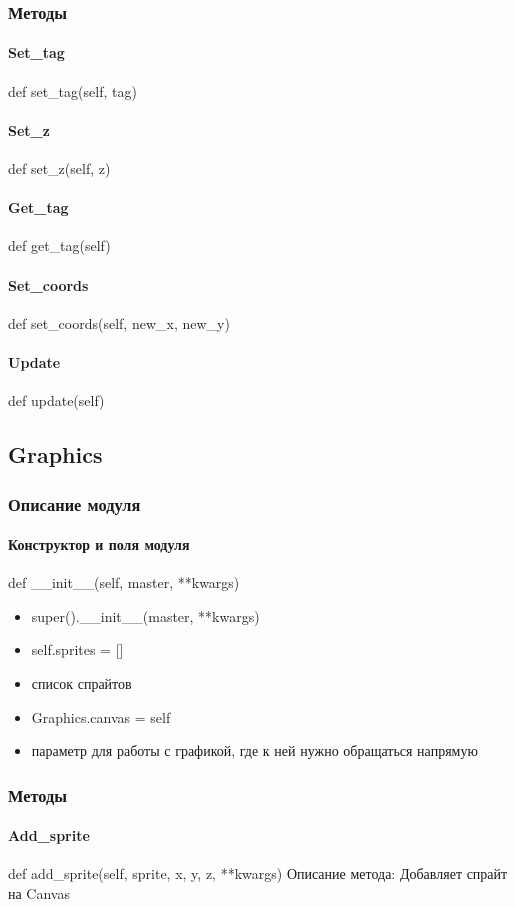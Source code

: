 \subsubsection{Методы}
\paragraph{Set\_tag}
def set\_tag(self, tag)
\paragraph{Set\_z}
def set\_z(self, z)
\paragraph{Get\_tag}
def get\_tag(self)
\paragraph{Set\_coords}
def set\_coords(self, new\_x, new\_y)
\paragraph{Update}
def update(self)
\subsection{Graphics}
\subsubsection{Описание модуля}
\paragraph{Конструктор и поля модуля}
def \_\_init\_\_(self, master, **kwargs)
\begin{itemize}
	\item super().\_\_init\_\_(master, **kwargs)
	\item self.sprites = [] 
	\item список спрайтов
	\item Graphics.canvas = self
	\item параметр для работы с графикой, где к ней нужно обращаться напрямую
\end{itemize}
\subsubsection{Методы}
\paragraph{Add\_sprite}
def add\_sprite(self, sprite, x, y, z, **kwargs)
Описание метода: Добавляет спрайт на Canvas
